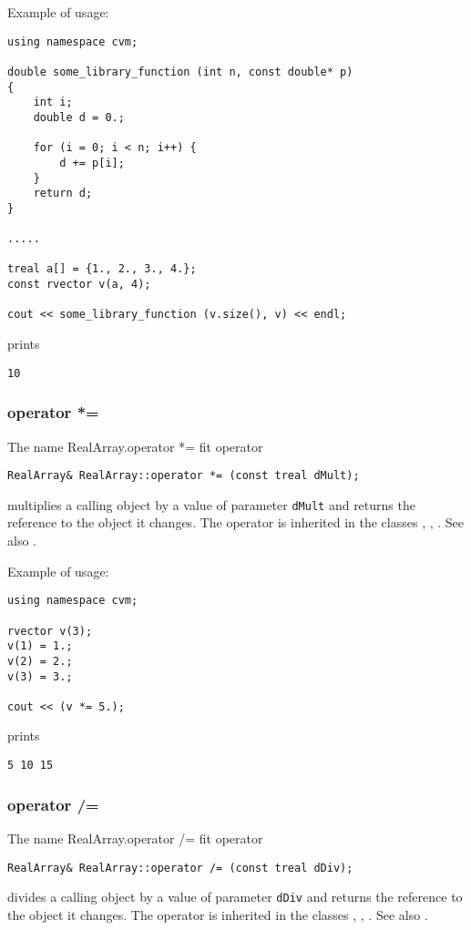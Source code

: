 Example of usage:
\begin{verbatim}
using namespace cvm;

double some_library_function (int n, const double* p)
{
    int i;
    double d = 0.;

    for (i = 0; i < n; i++) {
        d += p[i];
    }
    return d;
}

.....

treal a[] = {1., 2., 3., 4.};
const rvector v(a, 4);

cout << some_library_function (v.size(), v) << endl;
\end{verbatim}
prints
\begin{verbatim}
10
\end{verbatim}
\newpage



\subsubsection{operator *=}
The%
\pdfdest name {RealArray.operator *=} fit
operator
\begin{verbatim}
RealArray& RealArray::operator *= (const treal dMult);
\end{verbatim}
multiplies a calling object by a value of
parameter \verb"dMult" and returns the reference to
the object it changes.
The operator is inherited in the classes
,
,
.
See also .

Example of usage:
\begin{verbatim}
using namespace cvm;

rvector v(3);
v(1) = 1.;
v(2) = 2.;
v(3) = 3.;

cout << (v *= 5.);
\end{verbatim}
prints
\begin{verbatim}
5 10 15
\end{verbatim}
\newpage



\subsubsection{operator /=}
The%
\pdfdest name {RealArray.operator /=} fit
operator
\begin{verbatim}
RealArray& RealArray::operator /= (const treal dDiv);
\end{verbatim}
divides a calling object by a value of
parameter \verb"dDiv" and returns the reference to
the object it changes.
The operator is inherited in the classes
,
,
.
See also .

